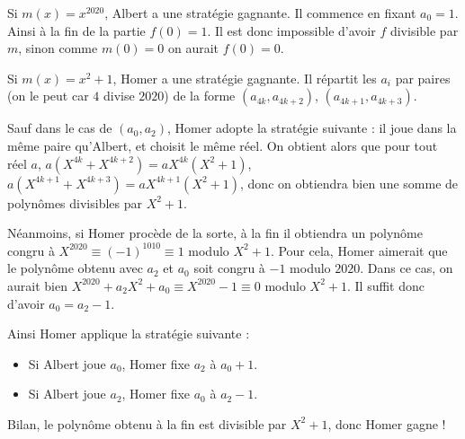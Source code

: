 Si $m(x)=x^{2020}$, Albert a une stratégie gagnante. Il commence en fixant $a_0=1$. Ainsi à la fin de la partie $f(0)=1$. Il est donc impossible d'avoir $f$ divisible par $m$, sinon comme $m(0)=0$ on aurait $f(0)=0$.
\smallskip

Si $m(x)=x^2+1$, Homer a une stratégie gagnante. Il répartit les $a_i$ par paires (on le peut car $4$ divise $2020$) de la forme $(a_{4k},a_{4k+2})$, $(a_{4k+1},a_{4k+3})$.

Sauf dans le cas de $(a_0, a_2)$, Homer adopte la stratégie suivante : il joue dans la même paire qu'Albert, et choisit le même réel. On obtient alors que pour tout réel $a$, $a(X^{4k}+X^{4k+2})=aX^{4k}(X^2+1)$, $a(X^{4k+1}+X^{4k+3})=aX^{4k+1}(X^2+1)$, donc on obtiendra bien une somme de polynômes divisibles par $X^2+1$.

Néanmoins, si Homer procède de la sorte, à la fin il obtiendra un polynôme congru à $X^{2020}\equiv (-1)^{1010}\equiv 1$ modulo $X^2+1$. Pour cela, Homer aimerait que le polynôme obtenu avec $a_2$ et $a_0$ soit congru à $-1$ modulo $2020$. Dans ce cas, on aurait bien $X^{2020}+a_2X^2+a_0\equiv X^{2020}-1\equiv 0$ modulo $X^2+1$. Il suffit donc d'avoir $a_0=a_2-1$.

Ainsi Homer applique la stratégie suivante :
\begin{itemize}
\item Si Albert joue $a_0$, Homer fixe $a_2$ à $a_0+1$.
\item Si Albert joue $a_2$, Homer fixe $a_0$ à $a_2-1$.
\end{itemize}

Bilan, le polynôme obtenu à la fin est divisible par $X^2+1$, donc Homer gagne !